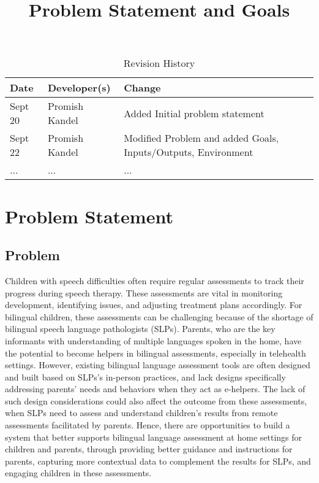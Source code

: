 \documentclass{article}
\title{Problem Statement and Goals\\\progname}
\author{\authname}
\date{}
\begin{document}
\maketitle

\begin{table}[hp]
\caption{Revision History} \label{TblRevisionHistory}
\begin{tabularx}{\textwidth}{llX}
\toprule
\textbf{Date} & \textbf{Developer(s)} & \textbf{Change}\\
\midrule
Sept 20 & Promish Kandel& Added Initial problem statement\\
Sept 22 & Promish Kandel & Modified Problem and added Goals, Inputs/Outputs, Environment\\
... & ... & ...\\
\bottomrule
\end{tabularx}
\end{table}

\section{Problem Statement}


\subsection{Problem}
\hspace{2em}Children with speech difficulties often require regular assessments to track their progress during speech therapy. These assessments are vital in monitoring development, identifying issues, and adjusting treatment plans accordingly. For bilingual children, these assessments can be challenging because of the shortage of bilingual  speech language pathologists (SLPs).  Parents, who are the key informants with understanding of multiple languages spoken in the home, have the potential to become helpers in bilingual assessments, especially in telehealth settings. However, existing bilingual language assessment tools are often designed and built based on SLPs’s in-person practices, and lack designs specifically addressing parents’ needs and behaviors when they act as e-helpers. The lack of such design considerations could also affect the outcome from these assessments, when SLPs need to assess and understand children’s results from remote assessments facilitated by parents. Hence, there are opportunities to build a system that better supports bilingual language assessment at home settings for children and parents, through providing better guidance and instructions for parents, capturing more contextual data to complement the results for SLPs, and engaging children in these assessments. 
\end{document}
